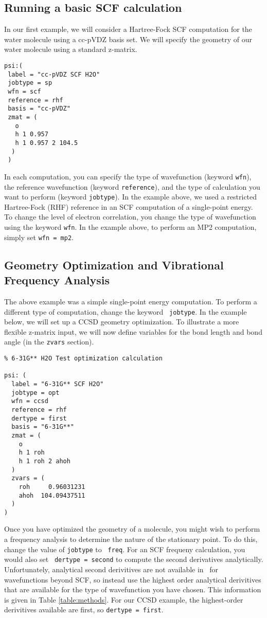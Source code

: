 \subsection{Running a basic SCF calculation}
In our first example, we will consider a Hartree-Fock SCF computation
for the water molecule using a cc-pVDZ basis set.  We will specify the
geometry of our water molecule using a standard z-matrix.

\begin{verbatim}
psi:(
 label = "cc-pVDZ SCF H2O"
 jobtype = sp
 wfn = scf
 reference = rhf
 basis = "cc-pVDZ"
 zmat = (
   o
   h 1 0.957
   h 1 0.957 2 104.5
  )
 )

\end{verbatim}

In each computation, you can specify the type of wavefunction (keyword
{\tt wfn}), the reference wavefunction (keyword {\tt reference}), and
the type of calculation you want to perform (keyword {\tt jobtype}).
In the example above, we used a restricted Hartree-Fock (RHF) reference
in an SCF computation of a single-point energy.  To change the level
of electron correlation, you change the type of wavefunction using the
keyword {\tt wfn}.  In the example above, to perform an
MP2 computation, simply set {\tt wfn = mp2}.

\subsection{Geometry Optimization and Vibrational Frequency Analysis}
The above example was a simple single-point energy computation.
To perform a different type of computation, change the keyword {\tt
jobtype}.  In the example below, we will set up
a CCSD geometry optimization.  To illustrate a more flexible z-matrix
input, we will now define variables for the bond length and bond angle
(in the {\tt zvars} section).

\begin{verbatim}
% 6-31G** H2O Test optimization calculation

psi: (
  label = "6-31G** SCF H2O"
  jobtype = opt
  wfn = ccsd
  reference = rhf
  dertype = first
  basis = "6-31G**"
  zmat = (
    o
    h 1 roh
    h 1 roh 2 ahoh
  )
  zvars = (
    roh     0.96031231
    ahoh  104.09437511
  )
)
\end{verbatim}

Once you have optimized the geometry of a molecule, you might wish to
perform a frequency analysis to determine the nature of the stationary
point.  To do this, change the value of {\tt jobtype} to {\tt
freq}.  For an SCF frequeny calculation, you would also set {\tt
dertype = second} to compute the second derivatives analytically.
Unfortunately, analytical second derivitives are not available 
in \PSIthree\ for wavefunctions beyond SCF,
so instead use the highest order analytical derivitives
that are available for the type of wavefunction you have chosen.  This
information is given in Table \ref{table:methods}.  For our CCSD example, the
highest-order derivitives available are first, so {\tt dertype = first}.

